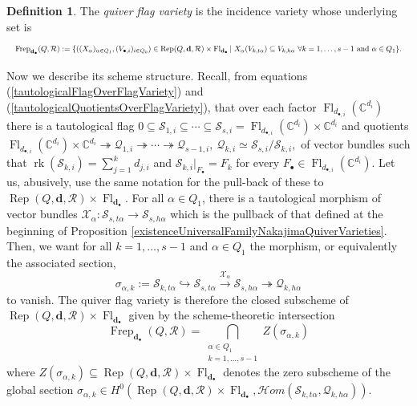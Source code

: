 \documentclass{amsart}
\theoremstyle{plain}
\numberwithin{equation}{section}
\theoremstyle{definition}
\newtheorem{definition}[theorem]{Definition}
\theoremstyle{remark}
\begin{document}
	\begin{definition}
		The \emph{quiver flag variety} is the incidence variety whose underlying set is
		$$
		\resizebox{\textwidth}{!}{$
		\operatorname{Frep}_{\mathbf{d}_{\bullet}}(Q,\mathcal{R}):=\{((X_{\alpha})_{\alpha\in Q_1},(V_{\bullet,i})_{i\in Q_0})\in \text{Rep}(Q,\mathbf{d},\mathcal{R})\times \operatorname{Fl}_{\mathbf{d}_\bullet}| \ X_{\alpha}(V_{k,t\alpha})\subseteq V_{k,h\alpha}\ \forall k=1,\ldots,s-1\text{ and } \alpha\in Q_1\}.$}
		$$
	\end{definition}
	Now we describe its scheme structure. Recall, from equations (\ref{tautologicalFlagOverFlagVariety}) and (\ref{tautologicalQuotientsOverFlagVariety}), that over each factor $\operatorname{Fl}_{d_{\bullet,i}}(\mathbb{C}^{d_i})$ there is a tautological flag $0\subseteq\mathcal{S}_{1,i}\subseteq\cdots\subseteq\mathcal{S}_{s,i}=\operatorname{Fl}_{d_{\bullet,i}}(\mathbb{C}^{d_i})\times \mathbb{C}^{d_i}$ and quotients 
	$
	\operatorname{Fl}_{d_{\bullet,i}}(\mathbb{C}^{d_i})\times\mathbb{C}^{d_i} \twoheadrightarrow \mathcal{Q}_{1,i}\twoheadrightarrow \cdots\twoheadrightarrow \mathcal{Q}_{s-1,i}, \ \mathcal{Q}_{k,i}\simeq \mathcal{S}_{s,i}/\mathcal{S}_{k,i},
	$
	of vector bundles such that $\operatorname{rk}(\mathcal{S}_{k,i})=\sum_{j=1}^kd_{j,i}$ and $\mathcal{S}_{k,i}|_{F_{\bullet}}=F_{k}$ for every $F_{\bullet}\in\operatorname{Fl}_{d_{\bullet,i}}(\mathbb{C}^{d_i})$. Let us, abusively, use the same notation for the pull-back of these to $\operatorname{Rep}(Q,\mathbf{d},\mathcal{R})\times \operatorname{Fl}_{\mathbf{d}_\bullet}$. For all $\alpha\in Q_1$, there is a tautological morphism of vector bundles $\mathcal{X}_{\alpha}:\mathcal{S}_{s,t\alpha}\to \mathcal{S}_{s,h\alpha}$ which is the pullback of that defined at the beginning of Proposition \ref{existenceUniversalFamilyNakajimaQuiverVarieties}. Then, we want for all $k=1,\ldots,s-1$ and $\alpha\in Q_1$ the morphism, or equivalently the associated section, 
	$$
	\sigma_{\alpha,k}:=\mathcal{S}_{k,t\alpha}\hookrightarrow \mathcal{S}_{s,t\alpha}\overset{\mathcal{X}_{\alpha}}{\longrightarrow}\mathcal{S}_{s,h\alpha}\twoheadrightarrow \mathcal{Q}_{k,h\alpha}
	$$
	to vanish. The quiver flag variety is therefore the closed subscheme of $\operatorname{Rep}(Q,\mathbf{d},\mathcal{R})\times \operatorname{Fl}_{\mathbf{d}_\bullet}$ given by the scheme-theoretic intersection 
	$$
	\operatorname{Frep}_{\mathbf{d}_{\bullet}}(Q,\mathcal{R}) = \bigcap_{\substack{\alpha\in Q_1 \\ k=1,\ldots,s-1}} Z(\sigma_{\alpha,k})
	$$
	where $Z(\sigma_{\alpha,k})\subseteq \operatorname{Rep}(Q,\mathbf{d},\mathcal{R})\times \operatorname{Fl}_{\mathbf{d}_\bullet}$ denotes the zero subscheme of the global section $\sigma_{\alpha,k}\in H^0( \operatorname{Rep}(Q,\mathbf{d},\mathcal{R})\times \operatorname{Fl}_{\mathbf{d}_\bullet},\mathcal{H}om(\mathcal{S}_{k,t\alpha},\mathcal{Q}_{k,h\alpha}))$.
\end{document}
